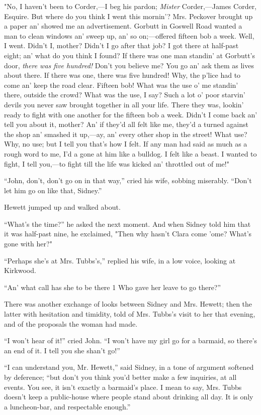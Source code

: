 "No, I haven't been to Corder,---I beg his pardon; \emph{Mister}
Corder,---James Corder, Esquire. But where do you think I went this
mornin'? Mrs. Peckover brought up a paper an' showed me an
advertisement. Gorbutt in Goswell Road wanted a man to clean windows an'
sweep up, an' so on;---offered fifteen bob a week. Well, I went. Didn't
I, mother? Didn't I go after that job? I got there at half-past eight;
an' what do you think I found? If there was one man standin' at
Gorbutt's door, \emph{there was five hundred!} Don't you believe me? You
go an' ask them as lives about there. If there was one, there was five
hundred! Why, the p'lice had to come an' keep the
{\protect\hypertarget{53}{}{}}road clear. Fifteen bob! What was the use
o' me standin' there, outside the crowd? What was the use, I say? Such a
lot o' poor starvin' devils you never saw brought together in all your
life. There they was, lookin' ready to fight with one another for the
fifteen bob a week. Didn't I come back an' tell you about it, mother?
An' if they'd all felt like me, they'd a turned against the shop an'
smashed it up,---ay, an' every other shop in the street! What use? Why,
no use; but I tell you that's how I felt. If any man had said as much as
a rough word to me, I'd a gone at him like a bulldog. I felt like a
beast. I wanted to fight, I tell you,---to fight till the life was
kicked an' throttled out of me!"

``John, don't, don't go on in that way,'' cried his wife, sobbing
miserably. ``Don't let him go on like that, Sidney.''

Hewett jumped up and walked about.

``What's the time?'' he asked the next moment. And when Sidney told him
that it was half-past nine, he exclaimed, "Then
{\protect\hypertarget{54}{}{}}why hasn't Clara come 'ome? What's gone
with her?"

``Perhaps she's at Mrs. Tubbs's,'' replied his wife, in a low voice,
looking at Kirkwood.

``An' what call has she to be there 1 Who gave her leave to go there?''

There was another exchange of looks between Sidney and Mrs. Hewett; then
the latter with hesitation and timidity, told of Mrs. Tubbs's visit to
her that evening, and of the proposals the woman had made.

``I won't hear of it!'' cried John. ``I won't have my girl go for a
barmaid, so there's an end of it. I tell you she shan't go!''

``I can understand you, Mr. Hewett,'' said Sidney, in a tone of argument
softened by deference; ``but don't you think you'd better make a few
inquiries, at all events. You see, it isn't exactly a barmaid's place. I
mean to say, Mrs. Tubbs doesn't keep a public-house where people stand
about drinking all day. It is only a luncheon-bar, and respectable
enough.''

